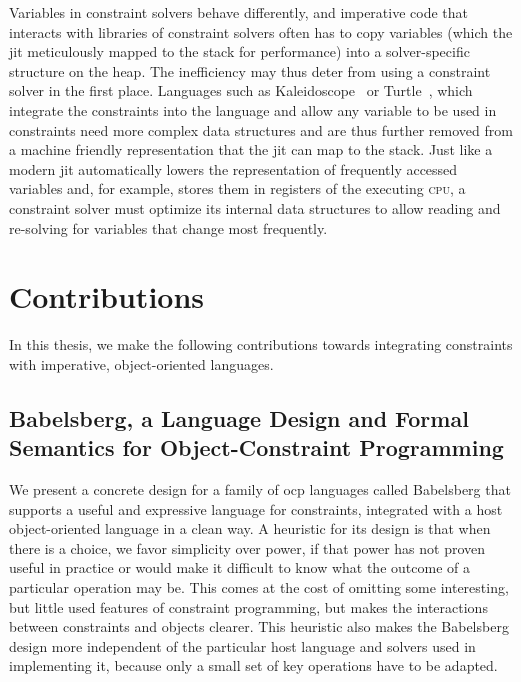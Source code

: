 Variables in constraint solvers behave differently, and imperative code that
interacts with libraries of constraint solvers often has to copy variables
(which the \ac{jit} meticulously mapped to the stack for performance) into a
solver-specific structure on the heap. The inefficiency may thus deter from
using a constraint solver in the first place. Languages such as
Kaleidoscope~\cite{lopez-oopsla-1994} or Turtle~\cite{grabmuller2004turtle},
which integrate the constraints into the language and allow any variable to be
used in constraints need more complex data structures and are thus further
removed from a machine friendly representation that the \ac{jit} can map to the
stack. Just like a modern \ac{jit} automatically lowers the representation of
frequently accessed variables and, for example, stores them in registers of the
executing \textsc{cpu}, a constraint solver must optimize its internal data
structures to allow reading and re-solving for variables that change most
frequently.

\section{Contributions}
\label{sec:contibutions}

In this thesis, we make the following contributions towards integrating
constraints with imperative, object-oriented languages.

\subsection{Babelsberg, a Language Design and Formal Semantics for
  Object-Constraint Programming}
We present a concrete design for a family of \gls{ocp} languages
called \gls{Babelsberg} that supports a useful and expressive language
for constraints, integrated with a host object-oriented language in a
clean way. A heuristic for its design is that when there is a choice,
we favor simplicity over power, if that power has not proven useful in
practice or would make it difficult to know what the outcome of a
particular operation may be. This comes at the cost of omitting some
interesting, but little used features of constraint programming, but
makes the interactions between constraints and objects clearer. This
heuristic also makes the \gls{Babelsberg} design more independent of
the particular host language and solvers used in implementing it,
because only a small set of key operations have to be adapted.


